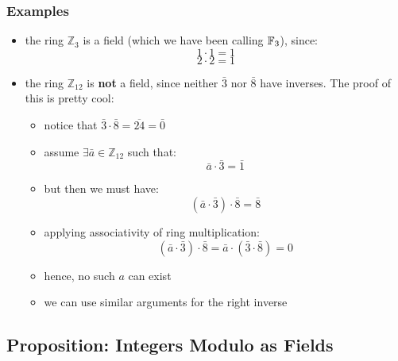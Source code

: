 \documentclass{exam}
\begin{document}
\subsubsection{Examples}

\begin{itemize}
    \item the ring $\mathbb{Z}_3$ is a field (which we have been calling $\mathbb{F}_3$), since:
    \[
    1 \cdot 1 = 1
    \]
    \[
    2 \cdot 2 = 1
    \]
    \item the ring $\mathbb{Z}_{12}$ is \textbf{not} a field, since neither $\bar{3}$ nor $\bar{8}$ have inverses. The proof of this is pretty cool:
    \begin{itemize}
        \item notice that $\bar{3} \cdot \bar{8} = \overline{24} = \bar{0}$
        \item assume $\exists \bar{a} \in \mathbb{Z}_12$ such that:
        \[
        \bar{a} \cdot \bar{3} = \bar{1}
        \]
        \item but then we must have:
        \[
        (\bar{a} \cdot \bar{3}) \cdot \bar{8} = \bar{8}
        \]
        \item applying associativity of ring multiplication:
        \[
        (\bar{a} \cdot \bar{3}) \cdot \bar{8} = \bar{a} \cdot (\bar{3} \cdot \bar{8}) = 0
        \]
        \item hence, no such $a$ can exist
        \item we can use similar arguments for the right inverse
    \end{itemize}
\end{itemize}

\subsection{Proposition: Integers Modulo as Fields}\label{p3111}

\end{document}
